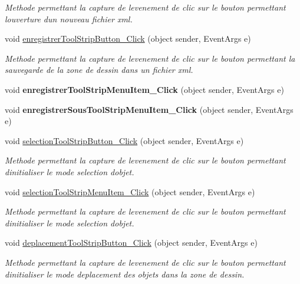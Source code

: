 \begin{DoxyCompactItemize}
\begin{DoxyCompactList}\small\item\em Methode permettant la capture de l\textquotesingle{}evenement de clic sur le bouton permettant l\textquotesingle{}ouverture d\textquotesingle{}un nouveau fichier xml. \end{DoxyCompactList}\item 
void \hyperlink{group__inf2990_ga228c87284edab5ff942fdc2b70dc2d90}{enregistrer\+Tool\+Strip\+Button\+\_\+\+Click} (object sender, Event\+Args e)
\begin{DoxyCompactList}\small\item\em Methode permettant la capture de l\textquotesingle{}evenement de clic sur le bouton permettant la sauvegarde de la zone de dessin dans un fichier xml. \end{DoxyCompactList}\item 
void {\bfseries enregistrer\+Tool\+Strip\+Menu\+Item\+\_\+\+Click} (object sender, Event\+Args e)
\item 
void {\bfseries enregistrer\+Sous\+Tool\+Strip\+Menu\+Item\+\_\+\+Click} (object sender, Event\+Args e)
\item 
void \hyperlink{group__inf2990_gac510e527874bc51454ea58492a1b6f0a}{selection\+Tool\+Strip\+Button\+\_\+\+Click} (object sender, Event\+Args e)
\begin{DoxyCompactList}\small\item\em Methode permettant la capture de l\textquotesingle{}evenement de clic sur le bouton permettant d\textquotesingle{}initialiser le mode selection d\textquotesingle{}objet. \end{DoxyCompactList}\item 
void \hyperlink{group__inf2990_ga06f622bf946e30e1ab41832c26b15553}{selection\+Tool\+Strip\+Menu\+Item\+\_\+\+Click} (object sender, Event\+Args e)
\begin{DoxyCompactList}\small\item\em Methode permettant la capture de l\textquotesingle{}evenement de clic sur le bouton permettant d\textquotesingle{}initialiser le mode selection d\textquotesingle{}objet. \end{DoxyCompactList}\item 
void \hyperlink{group__inf2990_gae8e6dce2e6a67419f700a044816a53a7}{deplacement\+Tool\+Strip\+Button\+\_\+\+Click} (object sender, Event\+Args e)
\begin{DoxyCompactList}\small\item\em Methode permettant la capture de l\textquotesingle{}evenement de clic sur le bouton permettant d\textquotesingle{}initialiser le mode deplacement des objets dans la zone de dessin. \end{DoxyCompactList}\item 

\end{DoxyCompactItemize}
